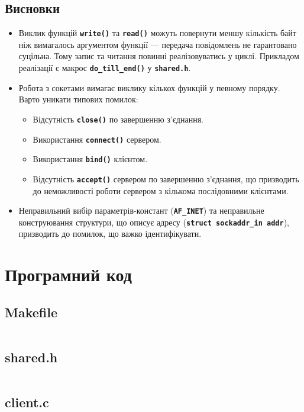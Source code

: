 \documentclass[a4paper]{article}
\newcommand{\code}[1]{\textbf{\texttt{#1}}}
\begin{document}
\subsection{Висновки}
\begin{itemize}
    \item
        Виклик функцій \code{write()} та \code{read()} можуть повернути меншу
        кількість байт ніж вимагалось аргументом функції — передача повідомлень
        не гарантовано суцільна. Тому запис та читання повинні реалізовуватись
        у циклі. Прикладом реалізації є макрос \code{do\_till\_end()} у
        \code{shared.h}.
    \item
        Робота з сокетами вимагає виклику кількох функцій у певному порядку. Варто уникати
        типових помилок:
        \begin{itemize}
            \item Відсутність \code{close()} по завершенню з'єднання.
            \item Використання \code{connect()} сервером.
            \item Використання \code{bind()} клієнтом.
            \item Відсутність \code{accept()} сервером по завершенню з'єднання,
                що призводить до неможливості роботи сервером з кількома послідовними
                клієнтами.
        \end{itemize}
    \item Неправильний вибір параметрів-констант (\code{AF\_INET}) та
        неправильне конструювання структури, що описує адресу
        (\code{struct sockaddr\_in addr}), призводить до помилок, що важко ідентифікувати.
\end{itemize}

\section{Програмний код}

\subsection{Makefile}
\inputminted{Makefile}{Makefile}

\subsection{shared.h}
\inputminted{C}{shared.h}

\subsection{client.c}
\inputminted{C}{client.c}
\end{document}
